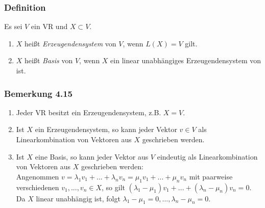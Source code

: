 \documentclass{article}
\begin{document}
\subsubsection*{Definition}
Es sei $V$ ein VR und $X \subset V$. \\
\begin{enumerate}
    \item $X$ heißt \textit{Erzeugendensystem} von $V$, wenn $L(X) = V$ gilt.
    \item $X$ heißt \textit{Basis} von $V$, wenn $X$ ein linear unabhängiges Erzeugendensystem von ist.
\end{enumerate}

\subsubsection*{Bemerkung 4.15}
\begin{enumerate}
    \item Jeder VR besitzt ein Erzeugendensystem, z.B. $X = V$.
    \item Ist $X$ ein Erzeugendensystem, so kann jeder Vektor $v \in V$ als Linearkombination von Vektoren aus $X$ geschrieben werden. 
    \item Ist $X$ eine Basis, so kann jeder Vektor aus $V$ eindeutig als Linearkombination von Vektoren aus $X$ geschrieben werden: \\
    Angenommen $v = \lambda_1 v_1 + ... + \lambda_n v_n = \mu_1 v_1 + ... + \mu_n v_n$ mit paarweise verschiedenen $v_1,...,v_n \in X$, so gilt $(\lambda_1 - \mu_1) v_1 + ... + (\lambda_n - \mu_n) v_n = 0$. Da $X$ linear unabhängig ist, folgt $\lambda_1 - \mu_1 = 0, ..., \lambda_n - \mu_n = 0$. \\
\end{enumerate}
\end{document}
